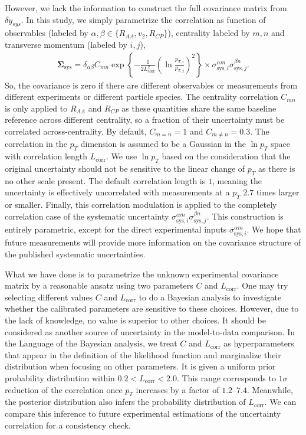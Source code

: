 However, we lack the information to construct the full covariance matrix from $\delta y_{sys}$.
In this study, we simply parametrize the correlation as function of observables (labeled by $\alpha, \beta \in \{R_{AA}, v_2, R_{CP}\}$), centrality labeled by $m,n$ and transverse momentum (labeled by $i,j$),
\begin{eqnarray}
\mathbf{\Sigma}_{\textrm{sys}} = \delta_{\alpha\beta} C_{mn}  \exp\left\{-\frac{1}{2 L_{\textrm{corr}}^2} \left(\ln\frac{p_{T, i}}{p_{T, j}}\right)^2 \right\} \times \sigma^{\alpha m}_{\textrm{sys}, i}\sigma^{\beta n}_{\textrm{sys}, j}.
\end{eqnarray}
So, the covariance is zero if there are different observables or measurements from different experiments or different particle species.
The centrality correlation $C_{mn}$ is only applied to $R_{AA}$ and $R_{CP}$ as these quantities share the same baseline reference across different centrality, so a fraction of their uncertainty must be correlated across-centrality. 
By default, $C_{m=n}=1$ and $C_{m\neq n}=0.3$.
The correlation in the $p_T$ dimension is assumed to be a Gaussian in the $\ln p_T$ space with correlation length $L_{\textrm{corr}}$.
We use $\ln p_T$ based on the consideration that the original uncertainty should not be sensitive to the linear change of $p_T$ as there is no other scale present.
The default correlation length is $1$, meaning the uncertainty is effectively uncorrelated with measurements at a $p_T$ $2.7$ times larger or smaller.
Finally, this correlation modulation is applied to the completely correlation case of the systematic uncertainty $\sigma^{\alpha m}_{\textrm{sys}, i}\sigma^{\beta n}_{\textrm{sys}, j}$.
This construction is entirely parametric, except for the direct experimental inputs $\sigma^{\alpha m}_{\textrm{sys}, i}$.
We hope that future measurements will provide more information on the covariance structure of the published systematic uncertainties.

What we have done is to parametrize the unknown experimental covariance matrix by a reasonable ansatz using two parameters $C$ and $L_{\textrm{corr}}$.
One may try selecting different values $C$ and $L_{\textrm{corr}}$ to do a Bayesian analysis to investigate whether the calibrated parameters are sensitive to these choices.
However, due to the lack of knowledge, no value is superior to other choices.
It should be considered as another source of uncertainty in the model-to-data comparison.
In the Language of the Bayesian analysis, we treat $C$ and  $L_{\textrm{corr}}$ as hyperparameters that appear in the definition of the likelihood function and marginalize their distribution when focusing on other parameters.
It is given a uniform prior probability distribution within $0.2 < L_{\textrm{corr}} < 2.0$.
This range corresponds to $1\sigma$ reduction of the correlation once $p_T$ increases by a factor of $1.2$--$7.4$.
Meanwhile, the posterior distribution also infers the probability distribution of $L_{\textrm{corr}}$.
We can compare this inference to future experimental estimations of the uncertainty correlation for a consistency check.

